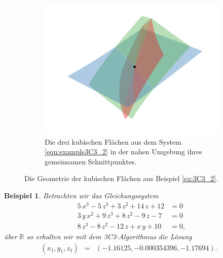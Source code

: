 \documentclass[a4paper,oneside, 11pt, openany%
]{article}
\newcommand{\R}{{\mathbb R}}
\theoremstyle{custom}
\theoremstyle{custom}
\newtheorem{example}{Beispiel}[section]
\begin{document}
\begin{figure}[H]\ContinuedFloat
	\begin{subfigure}[b]{0.8\textwidth}
	\includegraphics[width=\textwidth]{"images/e3c3_example2_zoom.png"}
	\caption{Die drei kubischen Flächen aus dem System \eqref{eqn:example3C3_2} in der nahen Umgebung ihres gemeinsamen Schnittpunktes.}
\end{subfigure}
\caption{Die Geometrie der kubischen Flächen aus Beispiel \ref{ex:3C3_2}.}
\end{figure}
\begin{example}\label{ex:3C3_3}
	Betrachten wir das Gleichungssystem
	\begin{equation}\label{eqn:example3C3_3}
		\begin{alignedat}{1}
			5\,x^3-5\,z^3+3\,z^2+14\,z+12&=0\\ 3\,y\,x^2+9\,z^3+8\,z^2-9\,z-7&=0\\ 8\,z^3-8\,z^2-12\,z+x\,y+10&=0,
		\end{alignedat}
	\end{equation}
	über $\R$ so erhalten wir mit dem 3C3-Algorithmus die Lösung
	\begin{equation*}
		\begin{alignedat}{5}
			&\left( x_{1},y_{1},z_{1}\right) &=& \left(-1.16125,-0.000354396,-1.17694 \right).&&
		\end{alignedat}
	\end{equation*}
\end{example}
\end{document}
